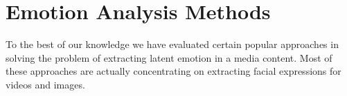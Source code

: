 \section{ Emotion Analysis Methods }
To the best of our knowledge we have evaluated certain popular approaches in solving the problem of extracting latent emotion in a media content. Most of these approaches are actually concentrating on extracting facial expressions for videos and images. 